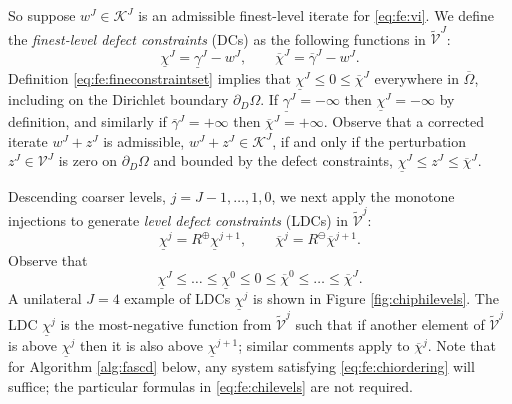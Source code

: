 \documentclass[letterpaper,final,12pt,reqno]{amsart}
\theoremstyle{cstyle}
\theoremstyle{cstyle*}
\theoremstyle{dstyle}
\numberwithin{equation}{section}
\numberwithin{figure}{section}
\numberwithin{table}{section}
\numberwithin{theorem}{section}
\newcommand{\cK}{\mathcal{K}}
\newcommand{\maxR}{R^{\bm{\oplus}}}
\newcommand{\minR}{R^{\bm{\ominus}}}
\begin{document}
So suppose $w^J \in \cK^J$ is an admissible finest-level iterate for \eqref{eq:fe:vi}.  We define the \emph{finest-level defect constraints} (DCs) \cite{GraeserKornhuber2009} as the following functions in $\tilde{\mathcal{V}}^J$:
\begin{equation}
\underline{\chi}^J = \underline{\gamma}^J - w^J, \qquad \overline{\chi}^J = \overline{\gamma}^J - w^J. \label{eq:fe:defectconstraints}
\end{equation}
Definition \eqref{eq:fe:fineconstraintset} implies that $\underline{\chi}^J \le 0 \le \overline{\chi}^J$ everywhere in $\overline{\Omega}$, including on the Dirichlet boundary $\partial_D\Omega$.  If $\underline{\gamma}^J=-\infty$ then $\underline{\chi}^J=-\infty$ by definition, and similarly if $\overline{\gamma}^J=+\infty$ then $\overline{\chi}^J=+\infty$.  Observe that a corrected iterate $w^J + z^J$ is admissible, $w^J + z^J \in \cK^J$, if and only if the perturbation $z^J \in \mathcal{V}^J$ is zero on $\partial_D\Omega$ and bounded by the defect constraints, $\underline{\chi}^J \le z^J \le \overline{\chi}^J$.

Descending coarser levels, $j=J-1,\dots,1,0$, we next apply the monotone injections to generate \emph{level defect constraints} (LDCs) in $\tilde{\mathcal{V}}^j$:
\begin{equation}
\underline{\chi}^{j} = \maxR \underline{\chi}^{j+1}, \qquad \overline{\chi}^{j} = \minR \overline{\chi}^{j+1}. \label{eq:fe:chilevels}
\end{equation}
Observe that
\begin{equation}
\underline{\chi}^{J} \le \dots \le \underline{\chi}^0 \le 0 \le \overline{\chi}^0 \le \dots \le \overline{\chi}^J. \label{eq:fe:chiordering}
\end{equation}
A unilateral $J=4$ example of LDCs $\underline{\chi}^j$ is shown in Figure \ref{fig:chiphilevels}.  The LDC $\underline{\chi}^j$ is the most-negative function from $\tilde{\mathcal{V}}^j$ such that if another element of $\tilde{\mathcal{V}}^j$ is above $\underline{\chi}^j$ then it is also above $\underline{\chi}^{j+1}$; similar comments apply to $\overline{\chi}^{j}$.  Note that for Algorithm \ref{alg:fascd} below, any system satisfying \eqref{eq:fe:chiordering} will suffice; the particular formulas in \eqref{eq:fe:chilevels} are not required.
\end{document}
